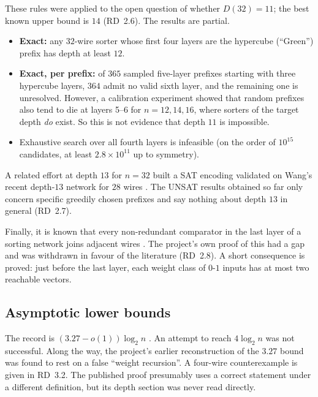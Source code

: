 These rules were applied to the open question of whether $D(32) = 11$; the best known upper bound is $14$ \cite{dobbelaere} (RD~2.6). The results are partial.
\begin{itemize}
    \item \textbf{Exact:} any $32$-wire sorter whose first four layers are the hypercube (``Green'') prefix has depth at least $12$.
    \item \textbf{Exact, per prefix:} of $365$ sampled five-layer prefixes starting with three hypercube layers, $364$ admit no valid sixth layer, and the remaining one is unresolved. However, a calibration experiment showed that random prefixes also tend to die at layers 5--6 for $n = 12, 14, 16$, where sorters of the target depth \emph{do} exist. So this is not evidence that depth $11$ is impossible.
    \item Exhaustive search over all fourth layers is infeasible (on the order of $10^{15}$ candidates, at least $2.8\times 10^{11}$ up to symmetry).
\end{itemize}
A related effort at depth $13$ for $n=32$ built a SAT encoding validated on Wang's recent depth-$13$ network for $28$ wires \cite{wang2025depth13}. The UNSAT results obtained so far only concern specific greedily chosen prefixes and say nothing about depth $13$ in general (RD~2.7).

Finally, it is known that every non-redundant comparator in the last layer of a sorting network joins adjacent wires \cite{codish2015endgame}. The project's own proof of this had a gap and was withdrawn in favour of the literature (RD~2.8). A short consequence is proved: just before the last layer, each weight class of $0$-$1$ inputs has at most two reachable vectors.

\subsection{Asymptotic lower bounds}\label{sec:asymptotic}

The record is $(3.27 - o(1))\log_2 n$ \cite{kahale1995lower}. An attempt to reach $4 \log_2 n$ was not successful. Along the way, the project's earlier reconstruction of the $3.27$ bound was found to rest on a false ``weight recursion''. A four-wire counterexample is given in RD~3.2. The published proof presumably uses a correct statement under a different definition, but its depth section was never read directly.


